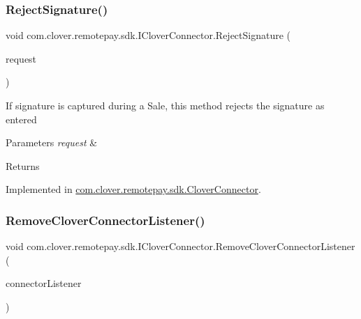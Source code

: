 \subsubsection{\texorpdfstring{Reject\+Signature()}{RejectSignature()}}
{\footnotesize\ttfamily void com.\+clover.\+remotepay.\+sdk.\+I\+Clover\+Connector.\+Reject\+Signature (\begin{DoxyParamCaption}\item[{\hyperlink{classcom_1_1clover_1_1remotepay_1_1sdk_1_1_verify_signature_request}{Verify\+Signature\+Request}}]{request }\end{DoxyParamCaption})}



If signature is captured during a Sale, this method rejects the signature as entered 


\begin{DoxyParams}{Parameters}
{\em request} & \\
\hline
\end{DoxyParams}
\begin{DoxyReturn}{Returns}

\end{DoxyReturn}


Implemented in \hyperlink{classcom_1_1clover_1_1remotepay_1_1sdk_1_1_clover_connector_a8a86e1d3994b81424b06e0846f52dc29}{com.\+clover.\+remotepay.\+sdk.\+Clover\+Connector}.

\mbox{\label{interfacecom_1_1clover_1_1remotepay_1_1sdk_1_1_i_clover_connector_a4acba7cae456cb73a0acf4331cae04f9}} 
\subsubsection{\texorpdfstring{Remove\+Clover\+Connector\+Listener()}{RemoveCloverConnectorListener()}}
{\footnotesize\ttfamily void com.\+clover.\+remotepay.\+sdk.\+I\+Clover\+Connector.\+Remove\+Clover\+Connector\+Listener (\begin{DoxyParamCaption}\item[{\hyperlink{interfacecom_1_1clover_1_1remotepay_1_1sdk_1_1_i_clover_connector_listener}{I\+Clover\+Connector\+Listener}}]{connector\+Listener }\end{DoxyParamCaption})}



